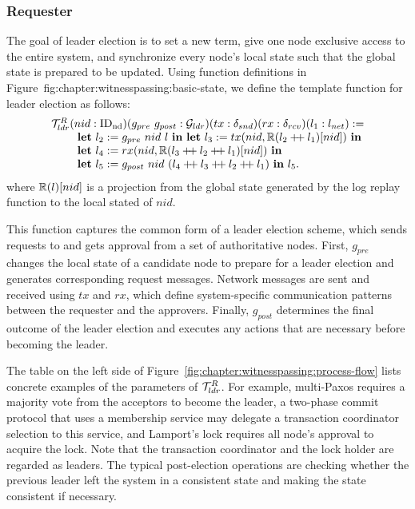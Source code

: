 \subsubsection{Requester}
The goal of leader election is to set a new term, give one node exclusive access to the
entire system, and synchronize every node's local state such that the
global state is prepared to be updated.
Using function definitions in Figure~{fig:chapter:witnesspassing:basic-state}, we define the template function for leader election as follows:
$$
\begin{array}{l}
	\ldrfunction (nid: \nodeid) (g_{pre}\ g_{post}:  \gldrfunction)
	(tx: \sendfunction)(rx: \recvfunction)(l_1  :\networklog ) := \\
\ \ \ \ \ \ \ \mbox{\textbf{let}} \ l_2 := g_{pre}\ nid \ l  \ \mbox{\textbf{in}}\ \mbox{\textbf{let}}\ l_3 := tx(nid, \replay(l_2 \mdoubleplus l_1)[nid]) \ \mbox{\textbf{in}}  \\
\ \ \ \ \ \ \ \mbox{\textbf{let}} \ l_4 := rx(nid, \replay(l_3 \mdoubleplus l_2 \mdoubleplus l_1)[nid]) \
  \mbox{\textbf{in}}\\ 
\ \ \ \ \ \ \ \mbox{\textbf{let}} \ l_5 := g_{post}\ nid \ (l_4 \mdoubleplus l_3 \mdoubleplus l_2 \mdoubleplus l_1) \ \mbox{\textbf{in}} \ l_5. \\
\end{array}
$$
where $\mathbb{R}(l)[nid]$ is a projection from the global state generated by the log replay function to 
the local stated of $nid$.

This function captures the common form of a leader election scheme, which sends requests to
and gets approval from a set of authoritative nodes.
First, $g_{pre}$ changes the local state of a candidate node to prepare
for a leader election and generates corresponding request messages.
Network messages are sent and received using $tx$ and $rx$, which define system-specific
communication patterns between the requester and the approvers.
Finally, $g_{post}$ determines the final outcome of the
leader election and executes any actions that are necessary before becoming the leader.

The table on the left side of Figure~\ref{fig:chapter:witnesspassing:process-flow} lists concrete examples of the parameters of
$\mathcal{T}^{R}_{ldr}$. For example, multi-Paxos requires a majority vote from the acceptors to
become the leader, a two-phase commit protocol that uses a membership service may delegate
a transaction coordinator selection to this service, and Lamport's lock requires all node's
approval to acquire the lock. Note that the transaction coordinator and the lock holder are
regarded as leaders. The typical post-election operations are checking whether the
previous leader left the system in a consistent state and making the state consistent
if necessary. 

